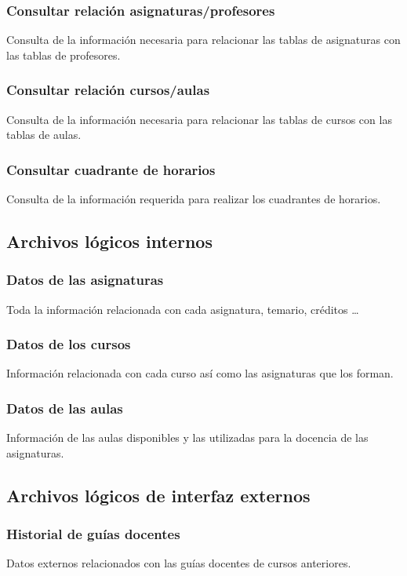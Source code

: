 \documentclass[11pt,a4paper,spanish,twoside]{book}
\begin{document}
\subsubsection{Consultar relación asignaturas/profesores}
Consulta de la información necesaria para relacionar las tablas de
asignaturas con las tablas de profesores.

\subsubsection{Consultar relación cursos/aulas}
Consulta de la información necesaria para relacionar las tablas de
cursos con las tablas de aulas.

\subsubsection{Consultar cuadrante de horarios}
Consulta de la información requerida para realizar los cuadrantes de horarios.

\subsection{Archivos lógicos internos}
\subsubsection{Datos de las asignaturas}
Toda la información relacionada con cada asignatura, temario, créditos \dots

\subsubsection{Datos de los cursos}
Información relacionada con cada curso así como las asignaturas que los forman.

\subsubsection{Datos de las aulas}
Información de las aulas disponibles y las utilizadas para la docencia de las
asignaturas. 

\subsection{Archivos lógicos de interfaz externos}
\subsubsection{Historial de guías docentes}
Datos externos relacionados con las guías docentes de cursos anteriores. 
 
\end{document}
